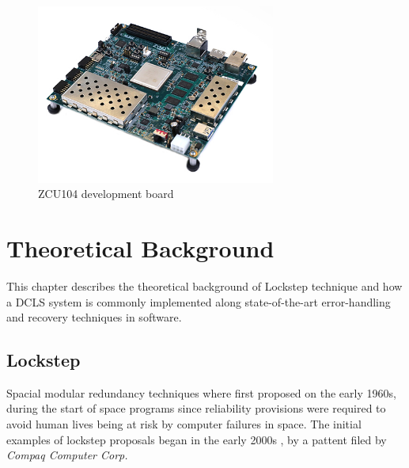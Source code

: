 \documentclass[10pt, a4paper]{report}
\begin{document}
\begin{figure}[h!]
    \begin{center}
        \includegraphics[width=0.7\textwidth]{zcu104.jpg}
        \caption{ZCU104 development board}
        \label{zcu104}
    \end{center}
\end{figure}


\chapter{Theoretical Background}
\thispagestyle{fancy}

This chapter describes the theoretical background of Lockstep technique and how
a \acrshort{DCLS} system is commonly implemented along state-of-the-art 
error-handling and recovery techniques in software.

\section{Lockstep}

Spacial modular redundancy techniques where first proposed on the early 1960s,
during the start of space programs since reliability provisions were required to
avoid human lives being at risk by computer failures in space. The initial
examples of lockstep proposals began in the early 2000s \cite{lockstep_patent},
by a pattent filed by \emph{Compaq Computer Corp.}
\end{document}
